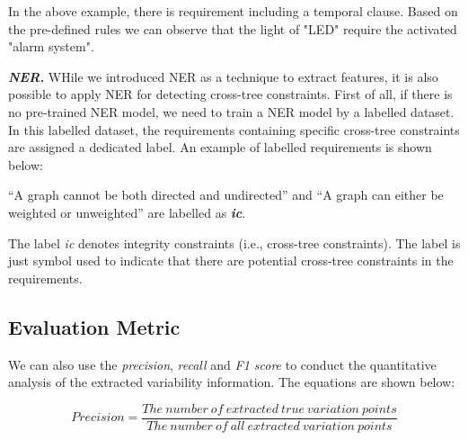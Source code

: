 \documentclass[graybox]{svmult}
\begin{document}
In the above example, there is requirement including a temporal clause. Based on the pre-defined rules we can observe that the light of "LED" require the activated "alarm system".

\textit{\textbf{NER.}} WHile we introduced NER as a technique to extract features, it is also possible to apply NER  for detecting cross-tree constraints. 
First of all, if there is no pre-trained NER model, we need to train a NER model by a labelled dataset. In this labelled dataset, the requirements containing specific cross-tree constraints are assigned a dedicated label. An example of labelled requirements \cite{BagheriEG12} is shown below:


\vspace{2mm}
\begin{mdframed}[style=mystyle]
``A graph cannot be both directed and undirected'' and ``A graph can either be weighted or unweighted'' are labelled as \textit{\textbf{ic}}.
\end{mdframed}
\vspace{4mm}

The label \textit{ic} denotes integrity constraints (i.e., cross-tree constraints). The label is just symbol used to indicate that there are potential cross-tree constraints in the requirements.



\subsection{Evaluation Metric}

We can also use the \textit{precision}, \textit{recall} and \textit{F1 score} to conduct the quantitative analysis of the extracted variability information. The equations are shown below:

\begin{equation}
Precision = \frac{The\ number\ of\ extracted\ true\ variation\ points}{ The\ number\ of\ all\ extracted\ variation\ points}
\end{equation}
\end{document}
